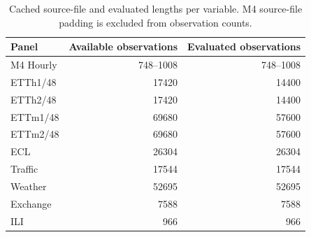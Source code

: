\begin{table}[!htbp]
\centering
\caption{Cached source-file and evaluated lengths per variable. M4 source-file padding is excluded from observation counts.}
\label{tab:rawlengths}
\small
\setlength{\tabcolsep}{3.5pt}
\begin{tabular}{lrr}
\hline
Panel & Available observations & Evaluated observations \\
\hline
M4 Hourly & 748--1008 & 748--1008 \\
ETTh1/48 & 17420 & 14400 \\
ETTh2/48 & 17420 & 14400 \\
ETTm1/48 & 69680 & 57600 \\
ETTm2/48 & 69680 & 57600 \\
ECL & 26304 & 26304 \\
Traffic & 17544 & 17544 \\
Weather & 52695 & 52695 \\
Exchange & 7588 & 7588 \\
ILI & 966 & 966 \\
\hline
\end{tabular}
\end{table}

